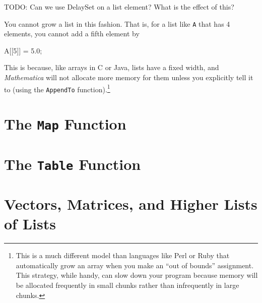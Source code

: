 TODO: Can we use DelaySet on a list element? What is the effect of this?

You cannot grow a list in this fashion. That is, for a list like \texttt{A} that has 4 elements, you cannot add a fifth element by 
\begin{code}
	   A[[5]] = 5.0;
\end{code}
This is because, like arrays in C or Java, lists have a fixed width, and \emph{Mathematica} will not allocate more memory for them unless you explicitly tell it to (using the \texttt{AppendTo} function).\footnote{This is a much different model than languages like Perl or Ruby that automatically grow an array when you make an ``out of bounds'' assignment. This strategy, while handy, can slow down your program because memory will be allocated frequently in small chunks rather than infrequently in large chunks.}

\section{The \texttt{Map} Function}

\section{The \texttt{Table} Function}

\section{Vectors, Matrices, and Higher Lists of Lists}
